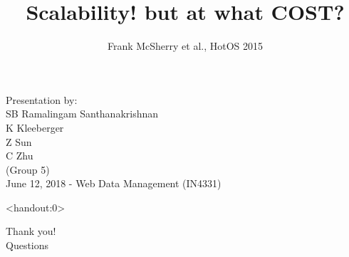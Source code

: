 \documentclass{beamer}
\title[]{Scalability! but at what COST?}
\author{Frank McSherry et al., HotOS 2015}
\date{}
\begin{document}
\begin{frame}[noframenumbering]
  \maketitle
  \vspace{2.25cm}
  \scriptsize{Presentation by:} \\
  \normalsize{
    SB Ramalingam Santhanakrishnan \\
    K Kleeberger \\
    Z Sun \\
    C Zhu \\
    (Group 5)\\
  }
  \vspace{0.6cm}
  \scriptsize{June 12, 2018 - Web Data Management (IN4331)}
\end{frame}











\begin{frame}<handout:0>
  \begin{center}
    \huge{Thank you!} \\
    \vspace{1.5cm}
    \large{Questions}
  \end{center}
\end{frame}
\end{document}
